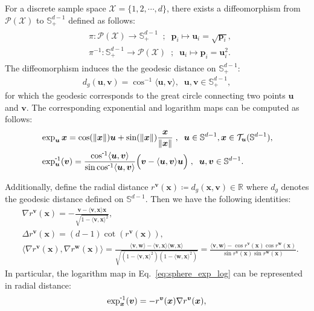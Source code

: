 For a discrete sample space $\mathcal{X}=\{1,2,\cdots,d\}$, there exists a diffeomorphism from $\mathcal{P}(\mathcal{X})$ to $\mathbb{S}^{d-1}_{+}$ defined as follows:
\begin{align}
\begin{split}
    &\pi: \mathcal{P}(\mathcal{X}) \rightarrow \mathbb{S}^{d-1}_{+} \;\; ; \;\; \bm{p}_i\mapsto \bm{u}_i=\sqrt{\bm{p}_i}, \\[6pt] 
    &\pi^{-1}: \mathbb{S}^{d-1}_{+} \rightarrow \mathcal{P}(\mathcal{X}) \;\; ; \;\;  \bm{u}_i\mapsto \bm{p}_i= \bm{u}_i^2.
\end{split}
\label{eq:diffeomorphism_app}
\end{align}
The diffeomorphism induces the the geodesic distance on $\mathbb{S}^{d-1}_{+}$:
\begin{align}
    d_g(\bm{u},\bm{v}) = \cos^{-1}\langle\bm{u}, \bm{v}\rangle, \;\; \bm{u},\bm{v}\in\mathbb{S}^{d-1}_{+},
\end{align}
for which the geodesic corresponds to the great circle connecting two points $\bm{u}$ and $\bm{v}$.
The corresponding exponential and logarithm maps can be computed as follows:
\begin{align}
    &\exp_{\bm{u}}{\bm{x}} = \cos(\|\bm{x}\|)\bm{u} + \sin(\|\bm{x}\|)\frac{\bm{x}}{\|\bm{x}\|} \;, \;\; 
    \bm{u}\in\mathbb{S}^{d-1} , \bm{x}\in \mathcal{T}_{\bm{u}}(\mathbb{S}^{d-1}), \\
    &\logmap{\bm{u}}{\bm{v}} = \frac{\invcos\langle \bm{u},\bm{v} \rangle}{\sin\invcos\langle \bm{u},\bm{v} \rangle}\Big( \bm{v} - \langle \bm{u},\bm{v} \rangle\bm{u} \Big) \;,\;\; \bm{u}, \bm{v} \in \mathbb{S}^{d-1}.
\label{eq:sphere_exp_log}
\end{align}

Additionally, define the radial distance $r^{\bm{v}}(\bm{x})\coloneqq d_g(\bm{x}, \bm{v}) \in \mathbb{R}$ where $d_g$ denotes the geodesic distance defined on $\mathbb{S}^{d-1}$. Then we have the following identities:
\begin{align}
    &\nabla r^{\bm{v}}(\bm{x})
    = -\frac{\bm{v} - \langle \bm{v}, \bm{x}\rangle \bm{x}}{\sqrt{1 - \langle \bm{v}, \bm{x}\rangle^2}}, \\
    &\Delta r^{\bm{v}}(\bm{x}) = (d-1)\cot(r^{\bm{v}}(\bm{x})), \\[6pt]
    &\Big\langle \nabla r^{\bm{v}}(\bm{x}), \nabla r^{\bm{w}}(\bm{x}) \Big\rangle 
    = \frac{\langle\bm{v}, \bm{w}\rangle - \langle\bm{v}, \bm{x}\rangle \langle\bm{w}, \bm{x}\rangle}{\sqrt{ \left(1 - \langle\bm{v}, \bm{x}\rangle^2\right) \left(1 - \langle\bm{w}, \bm{x}\rangle^2\right) }}
    = \frac{\langle\bm{v},\bm{w}\rangle - \cos r^{\bm{v}}(\bm{x})\cos r^{\bm{w}}(\bm{x})}{\sin r^{\bm{v}}(\bm{x}) \sin r^{\bm{w}}(\bm{x})}.
\end{align}
In particular, the logarithm map in Eq.~\eqref{eq:sphere_exp_log} can be represented in radial distance:
\begin{align}
    \logmap{\bm{x}}{\bm{v}} = -r^{\bm{v}}(\bm{x}) \nabla r^{\bm{v}}(\bm{x}),
\end{align}


